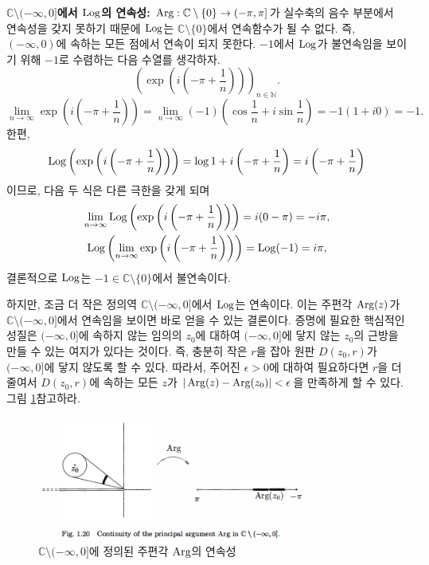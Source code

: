 {\bf $\mathbb C \setminus (-\infty, 0]$에서 $\mathop{\mathrm{Log}}$의 연속성: }
$\mathop{\mathrm{Arg}} : \mathbb C \setminus \{0\} \to (-\pi, \pi]$가 실수축의 음수 부분에서
연속성을 갖지 못하기 때문에 $\mathop{\mathrm{Log}}$는 $\mathbb C \setminus \{0\}$에서 연속함수가 될 수 없다.
즉, $(-\infty, 0)$에 속하는 모든 점에서 연속이 되지 못한다.
$-1$에서 $\mathop{\mathrm{Log}}$가 불연속임을 보이기 위해 $-1$로 수렴하는 다음 수열를 생각하자.
$$
\left( \exp \left( i \left( - \pi + \dfrac 1n \right) \right) \right)_{n\in\mathbb N}.
$$
$$
\lim_{n\to\infty} \exp \left( i \left( -\pi + \frac1n\right) \right) 
= \lim_{n\to\infty} (-1) \left(\cos \frac1n + i \sin \frac1n \right) 
= -1 (1+i0) = -1.
$$
한편,
$$
\mathop{\mathrm{Log}} \left( \exp \left( i \left( -\pi + \frac1n\right) \right) \right)
= \log 1 + i \left( - \pi + \displaystyle\frac1n \right) = i\left( - \pi + \displaystyle\frac1n \right)
$$
이므로, 다음 두 식은 다른 극한을 갖게 되며
\begin{gather*}
\lim_{n\to\infty}  \mathop{\mathrm{Log}} \left( \exp \left( i \left( -\pi + \frac1n\right) \right) \right)
= i(0 -\pi) = -i\pi, \\
\mathop{\mathrm{Log}} \left( \lim_{n\to\infty} \exp \left( i \left( -\pi + \frac1n\right) \right) \right)
= \mathop{\mathrm{Log}}(-1) = i\pi,
\end{gather*}
결론적으로 $\mathop{\mathrm{Log}}$는 $-1\in\mathbb C \setminus \{0\}$에서 불연속이다.

하지만, 조금 더 작은 정의역 $\mathbb C \setminus (-\infty, 0]$에서 
$\mathop{\mathrm{Log}}$는 연속이다.
이는 주편각 $\mathop{\mathrm{Arg}}(z)$가 $\mathbb C \setminus (-\infty, 0]$에서 연속임을 보이면
바로 얻을 수 있는 결론이다.
증명에 필요한 핵심적인 성질은
$(-\infty,0]$에 속하지 않는 임의의 $z_0$에 대하여
$(-\infty,0]$에 닿지 않는 $z_0$의 근방을 만들 수 있는 여지가 있다는 것이다.
즉, 충분히 작은 $r$을 잡아 원판 $D(z_0, r)$가 
$(-\infty,0]$에 닿지 않도록 할 수 있다.
따라서, 주어진 $\epsilon>0$에 대하여
필요하다면 $r$을 더 줄여서
$D(z_0, r)$에 속하는 모든 $z$가 $|\mathop{\mathrm{Arg}}(z) - \mathop{\mathrm{Arg}}(z_0)|<\epsilon$을 만족하게 할 수 있다.
그림 \ref{fig-1-20}\을 참고하라.

\begin{figure}[!h]
\begin{center}
\includegraphics[width=0.8\textwidth]{./SaltChapter/fig-1-20}
\end{center}
\caption{$\mathbb C\setminus (-\infty,0]$에 정의된 주편각 $\mathop{\mathrm{Arg}}$의 연속성}
\label{fig-1-20}
\end{figure}

